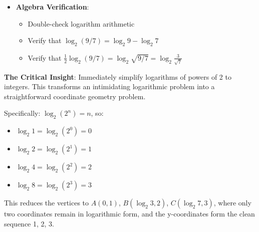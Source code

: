 \documentclass[12pt]{article}
\begin{document}
\begin{verificationbox}
\begin{itemize}[leftmargin=*]
    \item \textbf{Algebra Verification}:
    \begin{itemize}
        \item Double-check logarithm arithmetic
        \item Verify that $\log_2(9/7) = \log_2 9 - \log_2 7$
        \item Verify that $\frac{1}{2}\log_2(9/7) = \log_2\sqrt{9/7} = \log_2\frac{3}{\sqrt{7}}$
    \end{itemize}
\end{itemize}
\end{verificationbox}

\begin{keyinsightbox}
\textbf{The Critical Insight}: Immediately simplify logarithms of powers of 2 to integers. This transforms an intimidating logarithmic problem into a straightforward coordinate geometry problem.

Specifically: $\log_2(2^n) = n$, so:
\begin{itemize}
    \item $\log_2 1 = \log_2(2^0) = 0$
    \item $\log_2 2 = \log_2(2^1) = 1$
    \item $\log_2 4 = \log_2(2^2) = 2$
    \item $\log_2 8 = \log_2(2^3) = 3$
\end{itemize}

This reduces the vertices to $A(0, 1)$, $B(\log_2 3, 2)$, $C(\log_2 7, 3)$, where only two coordinates remain in logarithmic form, and the y-coordinates form the clean sequence 1, 2, 3.
\end{keyinsightbox}
\end{document}
